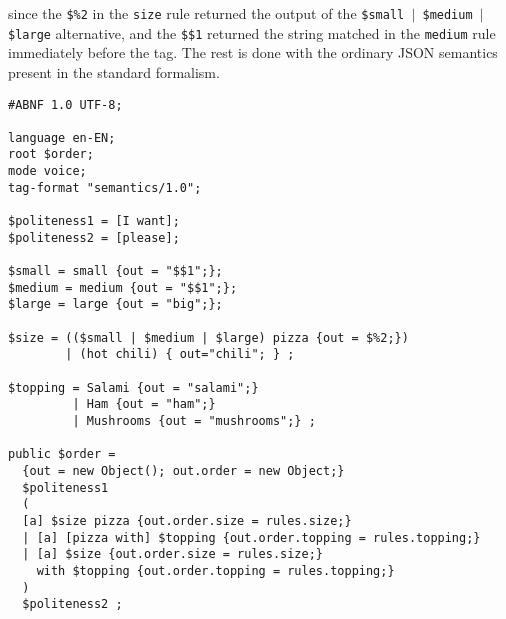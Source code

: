since the \verb|$%2| in the \texttt{size} rule returned the output of the \texttt{\$small $\vert$ \$medium $\vert$ \$large} alternative, and the \verb|$$1| returned the string matched in the \texttt{medium} rule immediately before the tag. The rest is done with the ordinary JSON semantics present in the standard formalism.

{\small%
\begin{verbatim}
#ABNF 1.0 UTF-8;

language en-EN;
root $order;
mode voice;
tag-format "semantics/1.0";

$politeness1 = [I want];
$politeness2 = [please];

$small = small {out = "$$1";};
$medium = medium {out = "$$1";};
$large = large {out = "big";};

$size = (($small | $medium | $large) pizza {out = $%2;})
        | (hot chili) { out="chili"; } ;

$topping = Salami {out = "salami";}
         | Ham {out = "ham";}
         | Mushrooms {out = "mushrooms";} ;

public $order =
  {out = new Object(); out.order = new Object;}
  $politeness1
  (
  [a] $size pizza {out.order.size = rules.size;}
  | [a] [pizza with] $topping {out.order.topping = rules.topping;}
  | [a] $size {out.order.size = rules.size;}
    with $topping {out.order.topping = rules.topping;}
  )
  $politeness2 ;
\end{verbatim}}

